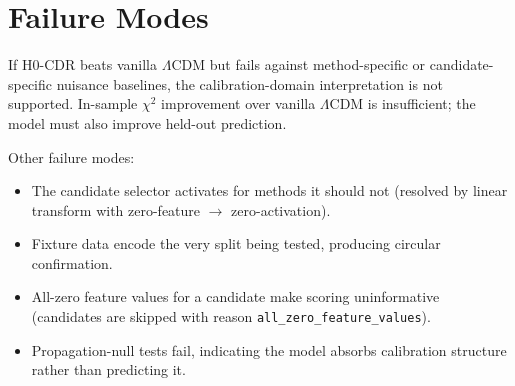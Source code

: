 \section{Failure Modes}

If H0-CDR beats vanilla $\Lambda$CDM but fails against method-specific or
candidate-specific nuisance baselines, the calibration-domain interpretation is
not supported. In-sample $\chi^2$ improvement over vanilla $\Lambda$CDM is
insufficient; the model must also improve held-out prediction.

Other failure modes:
\begin{itemize}
  \item The candidate selector activates for methods it should not (resolved by
    linear transform with zero-feature $\to$ zero-activation).
  \item Fixture data encode the very split being tested, producing circular
    confirmation.
  \item All-zero feature values for a candidate make scoring uninformative
    (candidates are skipped with reason \texttt{all\_zero\_feature\_values}).
  \item Propagation-null tests fail, indicating the model absorbs calibration
    structure rather than predicting it.
\end{itemize}
